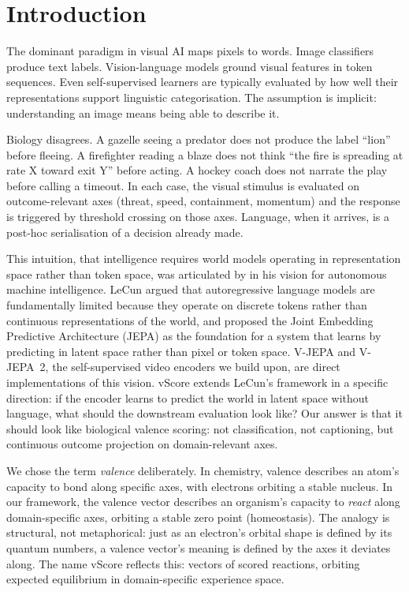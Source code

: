 \documentclass[11pt]{article}
\begin{document}
\section{Introduction}

The dominant paradigm in visual AI maps pixels to words. Image classifiers produce text labels. Vision-language models ground visual features in token sequences. Even self-supervised learners are typically evaluated by how well their representations support linguistic categorisation. The assumption is implicit: understanding an image means being able to describe it.

Biology disagrees. A gazelle seeing a predator does not produce the label ``lion'' before fleeing. A firefighter reading a blaze does not think ``the fire is spreading at rate X toward exit Y'' before acting. A hockey coach does not narrate the play before calling a timeout. In each case, the visual stimulus is evaluated on outcome-relevant axes (threat, speed, containment, momentum) and the response is triggered by threshold crossing on those axes. Language, when it arrives, is a post-hoc serialisation of a decision already made.

This intuition, that intelligence requires world models operating in representation space rather than token space, was articulated by \citet{lecun2022} in his vision for autonomous machine intelligence. LeCun argued that autoregressive language models are fundamentally limited because they operate on discrete tokens rather than continuous representations of the world, and proposed the Joint Embedding Predictive Architecture (JEPA) as the foundation for a system that learns by predicting in latent space rather than pixel or token space. V-JEPA and V-JEPA~2, the self-supervised video encoders we build upon, are direct implementations of this vision. vScore extends LeCun's framework in a specific direction: if the encoder learns to predict the world in latent space without language, what should the downstream evaluation look like? Our answer is that it should look like biological valence scoring: not classification, not captioning, but continuous outcome projection on domain-relevant axes.

We chose the term \textit{valence} deliberately. In chemistry, valence describes an atom's capacity to bond along specific axes, with electrons orbiting a stable nucleus. In our framework, the valence vector describes an organism's capacity to \textit{react} along domain-specific axes, orbiting a stable zero point (homeostasis). The analogy is structural, not metaphorical: just as an electron's orbital shape is defined by its quantum numbers, a valence vector's meaning is defined by the axes it deviates along. The name vScore reflects this: vectors of scored reactions, orbiting expected equilibrium in domain-specific experience space.
\end{document}

